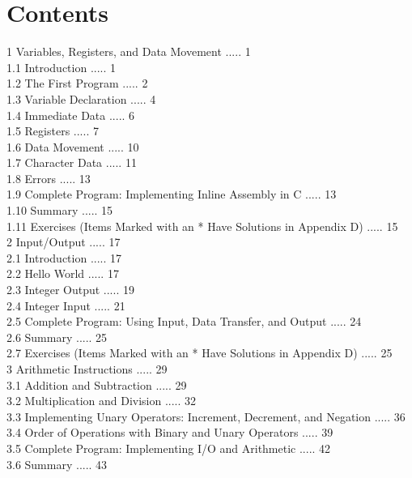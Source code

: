\documentclass[10pt]{book}
\begin{document}
\section{Contents}
1 Variables, Registers, and Data Movement ..... 1\\
1.1 Introduction ..... 1\\
1.2 The First Program ..... 2\\
1.3 Variable Declaration ..... 4\\
1.4 Immediate Data ..... 6\\
1.5 Registers ..... 7\\
1.6 Data Movement ..... 10\\
1.7 Character Data ..... 11\\
1.8 Errors ..... 13\\
1.9 Complete Program: Implementing Inline Assembly in C ..... 13\\
1.10 Summary ..... 15\\
1.11 Exercises (Items Marked with an * Have Solutions in Appendix D) ..... 15\\
2 Input/Output ..... 17\\
2.1 Introduction ..... 17\\
2.2 Hello World ..... 17\\
2.3 Integer Output ..... 19\\
2.4 Integer Input ..... 21\\
2.5 Complete Program: Using Input, Data Transfer, and Output ..... 24\\
2.6 Summary ..... 25\\
2.7 Exercises (Items Marked with an * Have Solutions in Appendix D) ..... 25\\
3 Arithmetic Instructions ..... 29\\
3.1 Addition and Subtraction ..... 29\\
3.2 Multiplication and Division ..... 32\\
3.3 Implementing Unary Operators: Increment, Decrement, and Negation ..... 36\\
3.4 Order of Operations with Binary and Unary Operators ..... 39\\
3.5 Complete Program: Implementing I/O and Arithmetic ..... 42\\
3.6 Summary ..... 43\\
\end{document}
